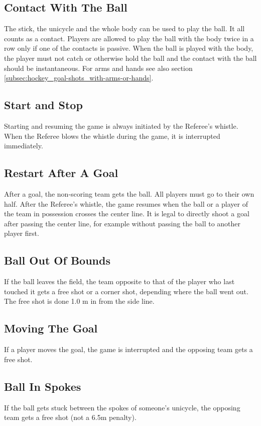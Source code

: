 \subsection{Contact With The Ball}
The stick, the unicycle and the whole body can be used to play the ball.
It all counts as a contact.
Players are allowed to play the ball with the body twice in a row only if one of the contacts is passive.
When the ball is played with the body, the player must not catch or otherwise hold the ball and the contact with the ball should be instantaneous.
For arms and hands see also section \ref{subsec:hockey_goal-shots_with-arms-or-hands}.

\subsection{Start and Stop}
Starting and resuming the game is always initiated by the Referee's whistle.
When the Referee blows the whistle during the game, it is interrupted immediately.

\subsection{Restart After A Goal}
After a goal, the non-scoring team gets the ball.
All players must go to their own half.
After the Referee's whistle, the game resumes when the ball or a player of the team in possession crosses the center line.
It is legal to directly shoot a goal after passing the center line, for example without passing the ball to another player first.

\subsection{Ball Out Of Bounds}
If the ball leaves the field, the team opposite to that of the player who last touched it gets a free shot or a corner shot, depending where the ball went out.
The free shot is done 1.0 m in from the side line.

\subsection{Moving The Goal}
If a player moves the goal, the game is interrupted and the opposing team gets a free shot.

\subsection{Ball In Spokes}
If the ball gets stuck between the spokes of someone's unicycle, the opposing team gets a free shot (not a 6.5m penalty).

